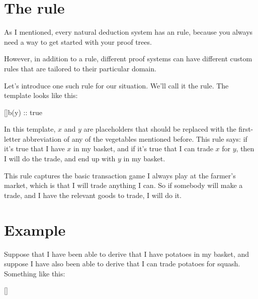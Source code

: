 \documentclass[../../../main.tex]{subfiles}
\begin{document}
\section{The  rule}

As I mentioned, every natural deduction system has an  rule, because you always need a way to get started with your proof trees.

However, in addition to a  rule, different proof systems can have different custom rules that are tailored to their particular domain. 

Let's introduce one such rule for our situation. We'll call it the  rule. The template looks like this:

\begin{prooftree*}
  []{b(y) :: true}
\end{prooftree*}

\noindent
In this template, $x$ and $y$ are placeholders that should be replaced with the first-letter abbreviation of any of the vegetables mentioned before. This rule says: if it's true that I have $x$ in my basket, and if it's true that I can trade $x$ for $y$, then I will do the trade, and end up with $y$ in my basket.

This rule captures the basic transaction game I always play at the farmer's market, which is that I will trade anything I can. So if somebody will make a trade, and I have the relevant goods to trade, I will do it.


\section{Example}

Suppose that I have been able to derive that I have potatoes in my basket, and suppose I have also been able to derive that I can trade potatoes for squash. Something like this:

\begin{prooftree*}
  \hypo{}
  \ellipsis{}{}

  \hypo{}
  \ellipsis{}{}  

  []{}
\end{prooftree*}
\end{document}
